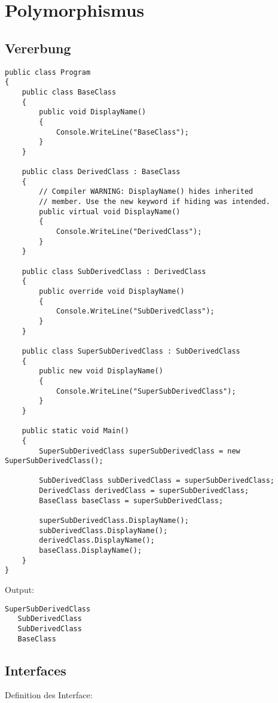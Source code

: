 \newpage
\section{Polymorphismus}

\subsection{Vererbung}
\begin{lstlisting}[style=Csharp]
public class Program
{
    public class BaseClass
    {
        public void DisplayName()
        {
            Console.WriteLine("BaseClass");
        }
    }

    public class DerivedClass : BaseClass
    {
        // Compiler WARNING: DisplayName() hides inherited
        // member. Use the new keyword if hiding was intended.
        public virtual void DisplayName()
        {
            Console.WriteLine("DerivedClass");
        }
    }

    public class SubDerivedClass : DerivedClass
    {
        public override void DisplayName()
        {
            Console.WriteLine("SubDerivedClass");
        }
    }

    public class SuperSubDerivedClass : SubDerivedClass
    {
        public new void DisplayName()
        {
            Console.WriteLine("SuperSubDerivedClass");
        }
    }

    public static void Main()
    {
        SuperSubDerivedClass superSubDerivedClass = new SuperSubDerivedClass();
        
        SubDerivedClass subDerivedClass = superSubDerivedClass;
        DerivedClass derivedClass = superSubDerivedClass;
        BaseClass baseClass = superSubDerivedClass;
        
        superSubDerivedClass.DisplayName();
        subDerivedClass.DisplayName();
        derivedClass.DisplayName();
        baseClass.DisplayName();
    }
}
\end{lstlisting}

Output:
\begin{lstlisting}[style=Csharp]
   SuperSubDerivedClass
   SubDerivedClass
   SubDerivedClass
   BaseClass
\end{lstlisting}


\newpage
\subsection{Interfaces}
Definition des Interface: 

